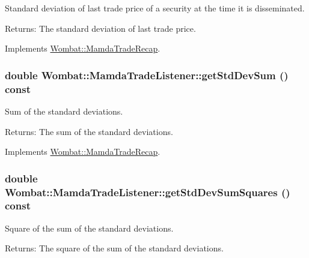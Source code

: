 Standard deviation of last trade price of a security at the time it is disseminated. 

\begin{Desc}
\item[Returns:]The standard deviation of last trade price. \end{Desc}


Implements \hyperlink{classWombat_1_1MamdaTradeRecap_388ccb8e0d7bbc9be4c2fbdbef376aa8}{Wombat::Mamda\-Trade\-Recap}.\hypertarget{classWombat_1_1MamdaTradeListener_3fa0c29ee90e004a4f9d56dccb1f9d28}{
\subsubsection[getStdDevSum]{\setlength{\rightskip}{0pt plus 5cm}double Wombat::Mamda\-Trade\-Listener::get\-Std\-Dev\-Sum () const}}
\label{classWombat_1_1MamdaTradeListener_3fa0c29ee90e004a4f9d56dccb1f9d28}


Sum of the standard deviations. 

\begin{Desc}
\item[Returns:]The sum of the standard deviations. \end{Desc}


Implements \hyperlink{classWombat_1_1MamdaTradeRecap_65b971acc07bbbc6f593b7e7a803e6c4}{Wombat::Mamda\-Trade\-Recap}.\hypertarget{classWombat_1_1MamdaTradeListener_42d76e2ecd19afbf40e583c079221e02}{
\subsubsection[getStdDevSumSquares]{\setlength{\rightskip}{0pt plus 5cm}double Wombat::Mamda\-Trade\-Listener::get\-Std\-Dev\-Sum\-Squares () const}}
\label{classWombat_1_1MamdaTradeListener_42d76e2ecd19afbf40e583c079221e02}


Square of the sum of the standard deviations. 

\begin{Desc}
\item[Returns:]The square of the sum of the standard deviations. \end{Desc}


